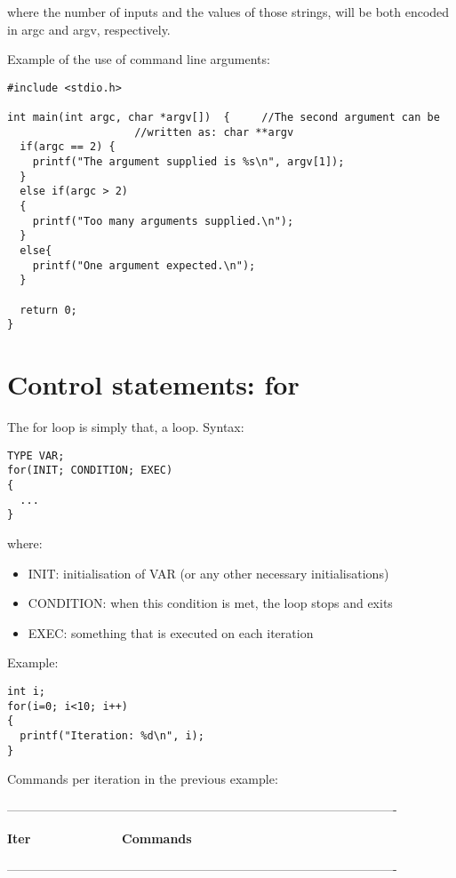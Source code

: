 \documentclass[11pt]{article}
\begin{document}
where the number of inputs and the values of those strings, will be both encoded in argc and argv, respectively.

Example of the use of command line arguments:

\begin{lstlisting}
#include <stdio.h>

int main(int argc, char *argv[])  { 	//The second argument can be
					//written as: char **argv
  if(argc == 2) {
    printf("The argument supplied is %s\n", argv[1]);
  }
  else if(argc > 2)
  {
    printf("Too many arguments supplied.\n");
  }
  else{
    printf("One argument expected.\n");
  }

  return 0;
}
\end{lstlisting}


\section{Control statements: for}

The for loop is simply that, a loop. Syntax:

\begin{lstlisting}[numbers=none]
TYPE VAR;
for(INIT; CONDITION; EXEC)
{
  ...
}
\end{lstlisting}

where:

\begin{itemize}
\item INIT: initialisation of VAR (or any other necessary initialisations)
\item CONDITION: when this condition is met, the loop stops and exits
\item EXEC: something that is executed on each iteration
\end{itemize}


Example:

\begin{lstlisting}[numbers=none]
int i;
for(i=0; i<10; i++)
{
  printf("Iteration: %d\n", i);
}
\end{lstlisting}


Commands per iteration in the previous example:

----------------------------------------------------------------------------------------------

\textbf{Iter} \ \ \ \ \ \ \ \ \ \ \ \ \ \ \textbf{Commands}

----------------------------------------------------------------------------------------------
\end{document}
